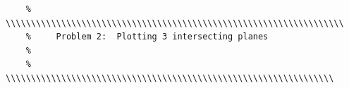 \documentclass{article}
\begin{document}
\begin{verbatim}
    % \\\\\\\\\\\\\\\\\\\\\\\\\\\\\\\\\\\\\\\\\\\\\\\\\\\\\\\\\\\\\\\\\\\
    %     Problem 2:  Plotting 3 intersecting planes
    %
    % \\\\\\\\\\\\\\\\\\\\\\\\\\\\\\\\\\\\\\\\\\\\\\\\\\\\\\\\\\\\\\\\\
    

\end{verbatim}
\end{document}
